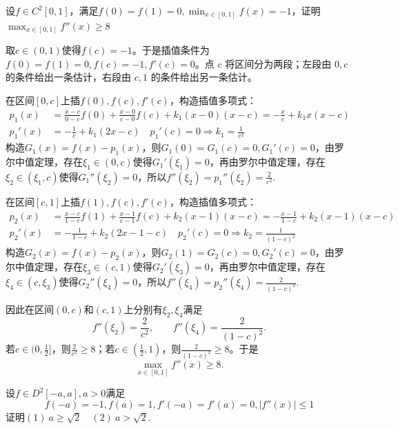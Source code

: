 \def\exampletitle{$\displaystyle\max_{x\in[0,1]}f''(x)\geqslant8$}
\begin{example}[\exampletitle]
    设$f\in C^2[0,1]$，满足$f(0)=f(1)=0,\displaystyle\min_{x\in[0,1]}f(x)=-1$，证明$\displaystyle\max_{x\in[0,1]}f''(x)\geqslant8$
\end{example}
\begin{solution}
取$c\in(0,1)$使得$f(c)=-1$。于是插值条件为$f(0)=f(1)=0,f(c)=-1,f'(c)=0$。点 $c$ 将区间分为两段；左段由 $0,c$ 的条件给出一条估计，右段由 $c,1$ 的条件给出另一条估计。

在区间$[0,c]$上插$f(0),f(c),f'(c)$，构造插值多项式：
\begin{align*}
    p_1(x)&=\frac{x-c}{0-c}f(0)+\frac{x-0}{c-0}f(c)+k_1(x-0)(x-c)=-\frac{x}{c}+k_1x(x-c)\\
    p_1'(x)&=-\frac1{c}+k_1(2x-c)\quad p_1'(c)=0\Rightarrow k_1=\frac1{c^2}
\end{align*}
构造$G_1(x)=f(x)-p_1(x)$，则$G_1(0)=G_1(c)=0,G_1'(c)=0$，由罗尔中值定理，存在$\xi_1\in(0,c)$使得$G_1'(\xi_1)=0$，再由罗尔中值定理，存在$\xi_2\in(\xi_1,c)$使得$G_1''(\xi_2)=0$，所以$f''(\xi_2)=p_1''(\xi_2)=\frac2{c^2}$.

在区间$[c,1]$上插$f(1),f(c),f'(c)$，构造插值多项式：
\begin{align*}
    p_2(x)&=\frac{x-c}{1-c}f(1)+\frac{x-1}{c-1}f(c)+k_2(x-1)(x-c)=-\frac{x-1}{1-c}+k_2(x-1)(x-c)\\
    p_2'(x)&=-\frac1{1-c}+k_2(2x-1-c)\quad p_2'(c)=0\Rightarrow k_2=\frac1{(1-c)^2}
\end{align*}
构造$G_2(x)=f(x)-p_2(x)$，则$G_2(1)=G_2(c)=0,G_2'(c)=0$，由罗尔中值定理，存在$\xi_3\in(c,1)$使得$G_2'(\xi_3)=0$，再由罗尔中值定理，存在$\xi_4\in(c,\xi_3)$使得$G_2''(\xi_4)=0$，所以$f''(\xi_4)=p_2''(\xi_4)=\frac2{(1-c)^2}$.

因此在区间$(0,c)$和$(c,1)$上分别有$\xi_2,\xi_4$满足
\[
f''(\xi_2)=\frac{2}{c^2},\qquad f''(\xi_4)=\frac{2}{(1-c)^2}.
\]
若$c\in(0,\frac12]$，则$\frac{2}{c^2}\geqslant8$；若$c\in(\frac12,1)$，则$\frac{2}{(1-c)^2}\geqslant8$。于是
\[
\max_{x\in[0,1]}f''(x)\geqslant8.
\]
\end{solution}
\newpage
\begin{example}
    设$f\in D^2\left[-a,a\right],a>0$满足
\[f\left(-a\right)=-1,f\left(a\right)=1,f'\left(-a\right)=f'\left(a\right)=0,\left|f''\left(x\right)\right|\leqslant1\]
证明$(1)~a\geqslant\sqrt2\quad (2)~a>\sqrt2.$
\end{example}
